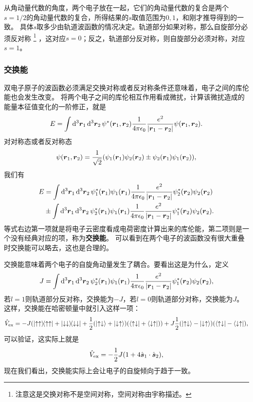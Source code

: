 \documentclass[UTF8, a4paper]{ctexart}
\begin{document}
从角动量代数的角度，两个电子放在一起，它们的角动量代数的复合是两个$s=1/2$的角动量代数的复合，所得结果的$s$取值范围为$0, 1$，和刚才推导得到的一致。
具体$s$取多少由轨道波函数的情况决定。轨道部分如果对称，那么自旋部分必须反对称%
\footnote{注意这是交换对称不是空间对称，空间对称由宇称描述。}%
，这对应$s=0$；反之，轨道部分反对称，则自旋部分必须对称，对应$s=1$。

\subsubsection{交换能}

双电子原子的波函数必须满足交换对称或者反对称条件还意味着，电子之间的库伦能也会发生改变。
将两个电子之间的库伦相互作用看成微扰，计算该微扰造成的能量本征值变化的一阶修正，就是
\begin{equation}
    E = \int \dd[3]{\vb*{r}_1} \dd[3]{\vb*{r}_2} \psi^*(\vb*{r}_1, \vb*{r}_2) \frac{1}{4\pi \epsilon_0} \frac{e^2}{\abs{\vb*{r}_1 - \vb*{r}_2}} \psi(\vb*{r}_1, \vb*{r}_2).
\end{equation}
对对称态或者反对称态
\[
    \psi(\vb*{r}_1, \vb*{r}_2) = \frac{1}{\sqrt{2}} (\psi_1(\vb*{r}_1) \psi_2(\vb*{r}_2) \pm \psi_2(\vb*{r}_1) \psi_1(\vb*{r}_2)),
\]
我们有
\begin{equation}
    \begin{aligned}
        E &= \int \dd[3]{\vb*{r}_1} \dd[3]{\vb*{r}_2} \psi_1^*(\vb*{r}_1) \psi_1(\vb*{r}_1) \frac{1}{4\pi \epsilon_0} \frac{e^2}{\abs{\vb*{r}_1 - \vb*{r}_2}} \psi_2^*(\vb*{r}_2) \psi_2(\vb*{r}_2) \\
        &\pm \int \dd[3]{\vb*{r}_1} \dd[3]{\vb*{r}_2} \psi_2^*(\vb*{r}_1) \psi_1(\vb*{r}_1) \frac{1}{4\pi \epsilon_0} \frac{e^2}{\abs{\vb*{r}_1 - \vb*{r}_2}} \psi_1^*(\vb*{r}_2) \psi_2(\vb*{r}_2).
    \end{aligned}
\end{equation}
等式右边第一项就是将电子云密度看成电荷密度计算出来的库伦能，第二项则是一个没有经典对应的项，称为\textbf{交换能}。
可以看到在两个电子的波函数没有很大重叠时交换能可以略去，这也是合理的。

交换能意味着两个电子的自旋角动量发生了耦合。要看出这是为什么，定义
\begin{equation}
    J = \int \dd[3]{\vb*{r}_1} \dd[3]{\vb*{r}_2} \psi_2^*(\vb*{r}_1) \psi_1(\vb*{r}_1) \frac{1}{4\pi \epsilon_0} \frac{e^2}{\abs{\vb*{r}_1 - \vb*{r}_2}} \psi_1^*(\vb*{r}_2) \psi_2(\vb*{r}_2),
\end{equation}
若$l=1$则轨道部分反对称，交换能为$-J$，若$l=0$则轨道部分对称，交换能为$J$。这样，交换能在哈密顿量中就引入这样一项：
\[
    \hat{V}_\text{ex} = -J ( \dyad{\uparrow \uparrow} + \dyad{\downarrow \downarrow} + \frac{1}{2} (\ket{\uparrow \downarrow} + \ket{\downarrow \uparrow}) (\bra{\uparrow \downarrow} + \bra{\downarrow \uparrow}) ) + J \frac{1}{2} (\ket{\uparrow \downarrow} - \ket{\downarrow \uparrow}) (\bra{\uparrow \downarrow} - \bra{\downarrow \uparrow}),
\]
可以验证，这实际上就是
\begin{equation}
    \hat{V}_\text{ex} = - \frac{1}{2} J (1 + 4 \hat{\vb*{s}}_1 \cdot \hat{\vb*{s}}_2),
\end{equation}
现在我们看出，交换能实际上会让电子的自旋倾向于趋于一致。
\end{document}

